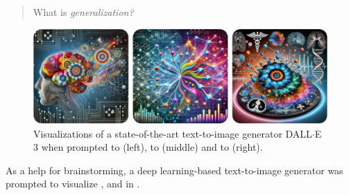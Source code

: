     \begin{quote}
        \centering \Large
        What is \emph{generalization?}
    \end{quote}

    \begin{figure}
        \includegraphics[width=\textwidth]{sections/01_introduction/figures/synthesized_generalization.pdf}
        \caption{Visualizations of a state-of-the-art text-to-image generator DALL$\cdot$E 3 \citep{xx} when prompted to  (left), to  (middle) and to  (right).}
        \label{fig:synthesized_generalization}
    \end{figure}

    As a help for brainstorming, a deep learning-based text-to-image generator \citep{xx} was prompted to visualize ,  and  in .

